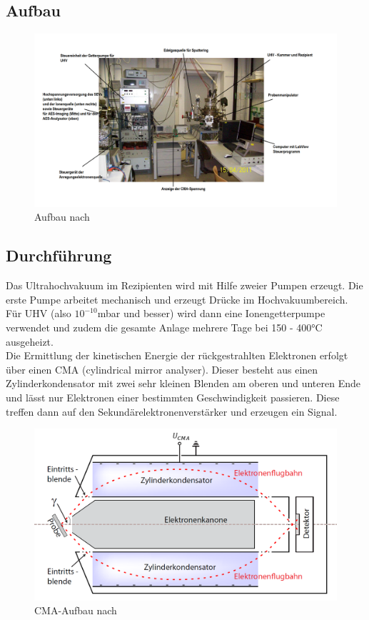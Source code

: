 \subsection{Aufbau} %
\label{sub:aufbau}

	\begin{figure}[H]
		\center
		\includegraphics[scale = 0.4]{Versuchsaufbau.png}
		\caption{Aufbau nach \cite{description}}
	\end{figure}


\subsection{Durchführung} %
\label{sub:durchf_hrung}

	Das Ultrahochvakuum im Rezipienten wird mit Hilfe zweier Pumpen erzeugt. 
	Die erste Pumpe arbeitet mechanisch und erzeugt Drücke im Hochvakuumbereich. 
	Für UHV (also $10^{-10}$mbar und besser) wird dann eine Ionengetterpumpe verwendet und zudem die gesamte Anlage mehrere Tage bei 150 - 400°C ausgeheizt. \cite{description}\\

	Die Ermittlung der kinetischen Energie der rückgestrahlten Elektronen erfolgt über einen CMA (cylindrical mirror analyser). 
	Dieser besteht aus einen Zylinderkondensator mit zwei sehr kleinen Blenden am oberen und unteren Ende und lässt nur Elektronen einer bestimmten Geschwindigkeit passieren. 
	Diese treffen dann auf den Sekundärelektronenverstärker und erzeugen ein Signal.

	\begin{figure}[H]
		\center
		\includegraphics[scale=0.3]{cma.png}
		\caption{CMA-Aufbau nach \cite{description}}
	\end{figure}

